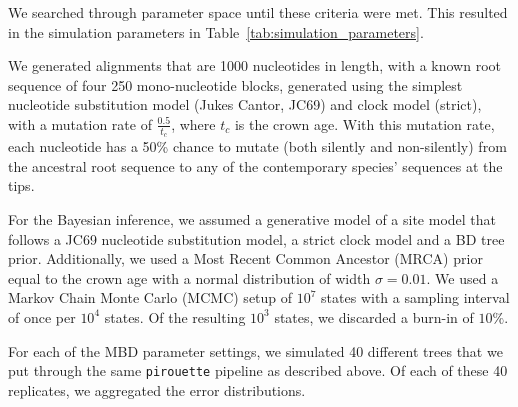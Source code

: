 We searched through parameter space until these criteria were met.
This resulted in the simulation parameters in Table~\ref{tab:simulation_parameters}.



We generated alignments that are 1000 nucleotides in length, with a known root sequence of four 250 mono-nucleotide blocks, generated using the simplest nucleotide substitution model (Jukes Cantor, JC69) and clock model (strict), with a mutation rate of $\frac{0.5}{t_c}$, where $t_c$ is the crown age. 
With this mutation rate, each nucleotide has a 50\% chance to mutate (both silently and non-silently) from the ancestral root sequence to any of the contemporary species' sequences at the tips. 

For the Bayesian inference, we assumed a generative model of a site model that
follows a JC69 nucleotide substitution model, a strict clock model and a BD tree prior.
Additionally, we used a Most Recent Common Ancestor (MRCA) prior equal to the crown age with a normal distribution of width $\sigma = 0.01$. We used a Markov Chain Monte Carlo (MCMC) setup of $10^7$ states with a sampling interval of once per $10^4$ states. Of the resulting $10^3$ states, we discarded a burn-in of $10\%$.

For each of the MBD parameter settings, we simulated 40 different trees
that we put through the same \verb;pirouette; pipeline as described above.
Of each of these 40 replicates, we aggregated the error distributions.



